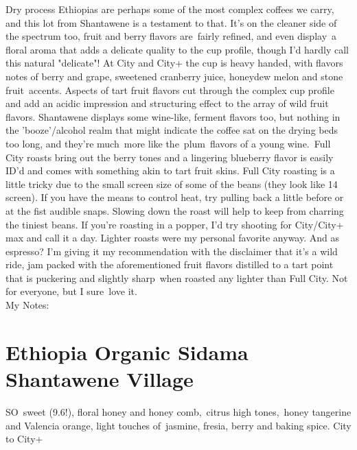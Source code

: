 \documentclass[10pt,twoside,footinclude=true,headinclude=true]{scrbook} %
\begin{document}
Dry process Ethiopias are perhaps some of the most complex coffees we carry, and this lot from Shantawene is a testament to that. It's on the cleaner side of the spectrum too, fruit and berry flavors are fairly refined, and even display a floral aroma that adds a delicate quality to the cup profile, though I'd hardly call this natural "delicate"! At City and City+ the cup is heavy handed, with flavors notes of berry and grape, sweetened cranberry juice, honeydew melon and stone fruit accents. Aspects of tart fruit flavors cut through the complex cup profile and add an acidic impression and structuring effect to the array of wild fruit flavors. Shantawene displays some wine-like, ferment flavors too, but nothing in the 'booze'/alcohol realm that might indicate the coffee sat on the drying beds too long, and they're much more like the plum flavors of a young wine. Full City roasts bring out the berry tones and a lingering blueberry flavor is easily ID'd and comes with something akin to tart fruit skins. Full City roasting is a little tricky due to the small screen size of some of the beans (they look like 14 screen). If you have the means to control heat, try pulling back a little before or at the fist audible snaps. Slowing down the roast will help to keep from charring the tiniest beans. If you're roasting in a popper, I'd try shooting for City/City+ max and call it a day. Lighter roasts were my personal favorite anyway. And as espresso? I'm giving it my recommendation with the disclaimer that it's a wild ride, jam packed with the aforementioned fruit flavors distilled to a tart point that is puckering and slightly sharp when roasted any lighter than Full City. Not for everyone, but I sure love it. \\
\medskip
\normalsize
My Notes:
\linespread{1.3}


\chapter*{Ethiopia Organic Sidama Shantawene Village}
 
\begin{addmargin}[2.2em]{2.2em}
\small
\justify
SO sweet (9.6!), floral honey and honey comb, citrus high tones, honey tangerine and Valencia orange, light touches of jasmine, fresia, berry and baking spice. City to City+
\end{addmargin}
\end{document}
